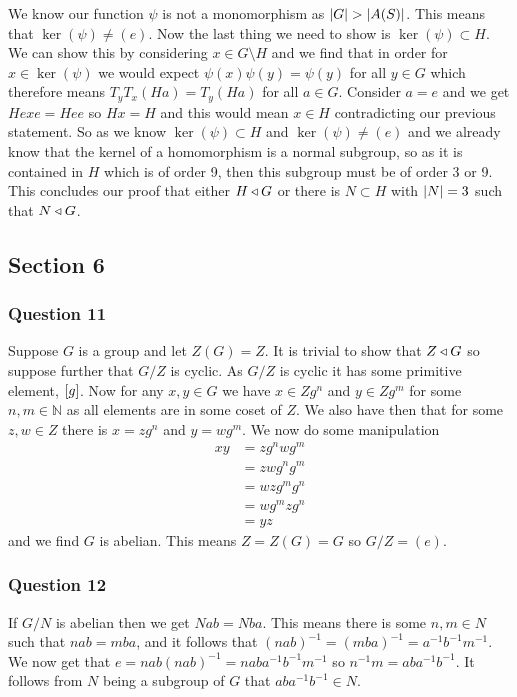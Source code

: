 \documentclass{article}
\begin{document}
We know our function $\psi$ is not a monomorphism as $\left| {G} \right| > \left| {A(S)} \right|$. This means that $\ker(\psi) \not= (e)$. Now the last thing we need to show is $\ker(\psi) \subset H$. We can show this by considering $x \in G \setminus H$ and we find that in order for $x\in \ker(\psi)$ we would expect $\psi(x)\psi(y) = \psi(y)$ for all $y\in G$ which therefore means $T_yT_x(Ha) = T_y(Ha)$ for all $a \in G$. Consider $a = e$ and we get $Hexe = Hee$ so $Hx = H$ and this would mean $x \in H$ contradicting our previous statement. So as we know $\ker(\psi) \subset H$ and $\ker(\psi) \not= (e)$ and we already know that the kernel of a homomorphism is a normal subgroup, so as it is contained in $H$ which is of order 9, then this subgroup must be of order 3 or 9. This concludes our proof that either $H\triangleleft G$ or there is $N \subset H$ with $\left| {N} \right| = 3$ such that $N \triangleleft G$.

\subsection{Section 6}
\subsubsection{Question 11}
Suppose $G$ is a group and let $Z(G) = Z$. It is trivial to show that $Z \triangleleft G$ so suppose further that $G/Z$ is cyclic. As $G/Z$ is cyclic it has some primitive element, $\left[{g}\right]$. Now for any $x,y \in G$ we have $x \in Zg^n$ and $y \in Zg^m$ for some $n,m\in\mathbb N$ as all elements are in some coset of $Z$. We also have then that for some $z,w \in Z$ there is $x = zg^n$ and $y = wg^m$. We now do some manipulation
\begin{align*}
xy &= zg^nwg^m \\
&= zwg^ng^m \\
&= wzg^mg^n \\
&= wg^mzg^n \\
&= yz
\end{align*}
and we find $G$ is abelian. This means $Z = Z(G) = G$ so $G/Z = (e)$.

\subsubsection{Question 12}
If $G/N$ is abelian then we get $Nab = Nba$. This means there is some $n,m \in N$ such that $nab = mba$, and it follows that $(nab)^{-1} = (mba)^{-1} = a^{-1}b^{-1}m^{-1}$. We now get that $e = nab(nab)^{-1} = naba^{-1}b^{-1}m^{-1}$ so $n^{-1}m = aba^{-1}b^{-1}$. It follows from $N$ being a subgroup of $G$ that $aba^{-1}b^{-1} \in N$.
\end{document}
